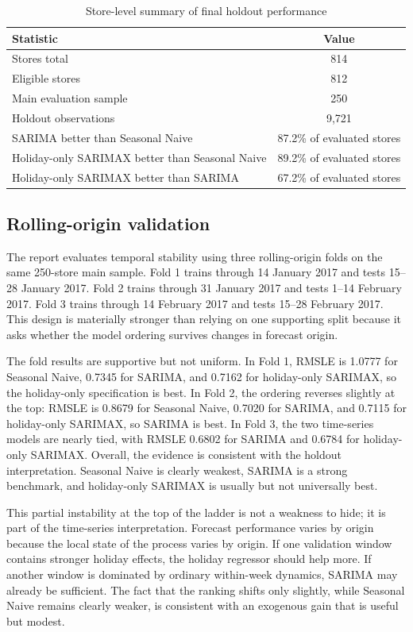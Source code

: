 \documentclass[11pt,oneside]{scrartcl}
\begin{document}
\begin{table}[H]
\centering
\caption{Store-level summary of final holdout performance}
\begin{tabular}{lc}
\toprule
Statistic & Value \\
\midrule
Stores total & 814 \\
Eligible stores & 812 \\
Main evaluation sample & 250 \\
Holdout observations & 9{,}721 \\
SARIMA better than Seasonal Naive & 87.2\% of evaluated stores \\
Holiday-only SARIMAX better than Seasonal Naive & 89.2\% of evaluated stores \\
Holiday-only SARIMAX better than SARIMA & 67.2\% of evaluated stores \\
\bottomrule
\end{tabular}
\end{table}

\subsection{Rolling-origin validation}
The report evaluates temporal stability using three rolling-origin folds on the same 250-store main sample. Fold 1 trains through 14 January 2017 and tests 15--28 January 2017. Fold 2 trains through 31 January 2017 and tests 1--14 February 2017. Fold 3 trains through 14 February 2017 and tests 15--28 February 2017. This design is materially stronger than relying on one supporting split because it asks whether the model ordering survives changes in forecast origin.

The fold results are supportive but not uniform. In Fold 1, RMSLE is 1.0777 for Seasonal Naive, 0.7345 for SARIMA, and 0.7162 for holiday-only SARIMAX, so the holiday-only specification is best. In Fold 2, the ordering reverses slightly at the top: RMSLE is 0.8679 for Seasonal Naive, 0.7020 for SARIMA, and 0.7115 for holiday-only SARIMAX, so SARIMA is best. In Fold 3, the two time-series models are nearly tied, with RMSLE 0.6802 for SARIMA and 0.6784 for holiday-only SARIMAX. Overall, the evidence is consistent with the holdout interpretation. Seasonal Naive is clearly weakest, SARIMA is a strong benchmark, and holiday-only SARIMAX is usually but not universally best.

This partial instability at the top of the ladder is not a weakness to hide; it is part of the time-series interpretation. Forecast performance varies by origin because the local state of the process varies by origin. If one validation window contains stronger holiday effects, the holiday regressor should help more. If another window is dominated by ordinary within-week dynamics, SARIMA may already be sufficient. The fact that the ranking shifts only slightly, while Seasonal Naive remains clearly weaker, is consistent with an exogenous gain that is useful but modest.
\end{document}
